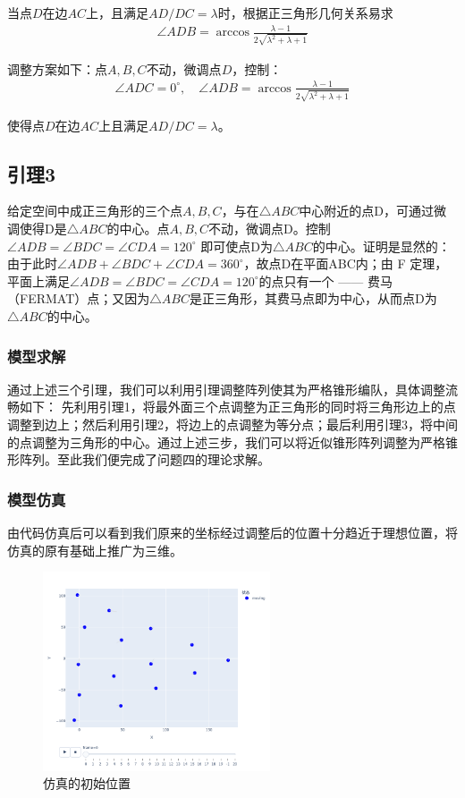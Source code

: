 \documentclass[withoutpreface,bwprint]{cumcmthesis} %
\begin{document}
当点\( D \)在边\( AC \)上，且满足\( AD/DC = \lambda \)时，根据正三角形几何关系易求
\begin{align}
    \angle ADB = \arccos \frac{\lambda - 1}{2\sqrt{\lambda^2 + \lambda + 1}}
\end{align}


调整方案如下：点\( A,B,C \)不动，微调点\( D \)，控制：
\begin{align}
    \angle ADC = 0^\circ, \quad \angle ADB = \arccos \frac{\lambda - 1}{2\sqrt{\lambda^2 + \lambda + 1}}
\end{align}

使得点\( D \)在边\( AC \)上且满足\( AD/DC = \lambda \)。
\subsection*{引理3} 
给定空间中成正三角形的三个点\(A,B,C\)，与在\(\triangle ABC\)中心附近的点D，可通过微调使得D是\(\triangle ABC\)的中心。点\(A,B,C\)不动，微调点D。控制
\(\angle ADB = \angle BDC = \angle CDA = 120^\circ\)
即可使点D为\(\triangle ABC\)的中心。证明是显然的：由于此时\(\angle ADB + \angle BDC + \angle CDA = 360^\circ\)，故点D在平面ABC内；由 F 定理，平面上满足\(\angle ADB = \angle BDC = \angle CDA = 120^\circ\)的点只有一个 —— 费马（FERMAT）点；又因为\(\triangle ABC\)是正三角形，其费马点即为中心，从而点D为\(\triangle ABC\)的中心。

\subsubsection{模型求解}
通过上述三个引理，我们可以利用引理调整阵列使其为严格锥形编队，具体调整流畅如下：
先利用引理1，将最外面三个点调整为正三角形的同时将三角形边上的点调整到边上；然后利用引理2，将边上的点调整为等分点；最后利用引理3，将中间的点调整为三角形的中心。通过上述三步，我们可以将近似锥形阵列调整为严格锥形阵列。至此我们便完成了问题四的理论求解。
\subsubsection{模型仿真}

由代码仿真后可以看到我们原来的坐标经过调整后的位置十分趋近于理想位置，将仿真的原有基础上推广为三维。
\begin{figure}[H]
    \centering
    \includegraphics[width=0.6\textwidth]{../figure/start_4.png} 
    \caption{仿真的初始位置}
    \label{q4_2}    
\end{figure}
\end{document}
